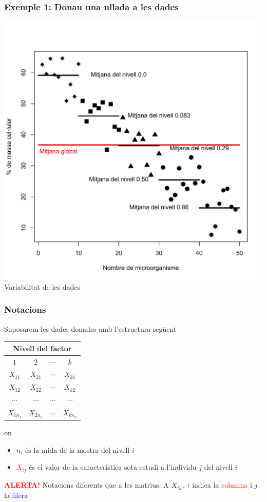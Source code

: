 \documentclass[12pt,t]{beamer}
\newcommand{\red}[1]{\textcolor{red}{#1}}
\newcommand{\blue}[1]{\textcolor{blue}{#1}}
\renewcommand{\emph}[1]{{\color{red}#1}}
\theoremstyle{plain}
\theoremstyle{definition}
\begin{document}
\begin{frame}
\frametitle{Exemple 1: Donau una ullada a les dades}
\vspace*{-8ex}

\begin{center}
\includegraphics[width=0.8\linewidth]{varCO2-1.pdf}\\
Variabilitat de les dades
\end{center}

\end{frame}



\begin{frame}
\frametitle{Notacions}

Suposarem les dades donades amb l'estructura següent
\begin{center}
\begin{tabular}{cccc}
\multicolumn{4}{c}{Nivell del factor}\\\hline
$1$&$2$&$\cdots$&$k$\\\hline
$X_{11}$&$X_{21}$&$\cdots$&$X_{k1}$\\
$X_{12}$&$X_{22}$&$\cdots$&$X_{k2}$\\
$\cdots$&$\cdots$&$\cdots$&$\cdots$\\
$X_{1n_1}$&$X_{2n_2}$&$\cdots$&$X_{kn_k}$\\\hline
\end{tabular}
\end{center}
on 
\begin{itemize}
\item \emph{$n_i$} és la mida de la mostra del nivell $i$
\medskip

\item \red{$X_{ij}$} és el valor de la característica sota estudi a l'individu $j$ del nivell $i$
\end{itemize}
\medskip

\red{\bf ALERTA!} Notacions diferents que a les matrius. A $X_{\red{i}\blue{j}}$, \red{$i$} indica la \red{columna} i \blue{$j$} la \blue{filera}

\end{frame}
\end{document}
